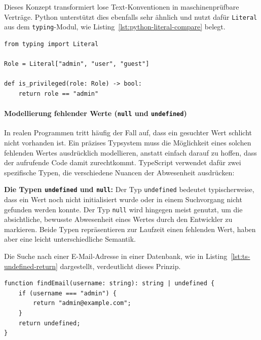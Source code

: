 Dieses Konzept transformiert lose Text-Konventionen in maschinenprüfbare Verträge. Python unterstützt dies ebenfalls sehr ähnlich und nutzt dafür \texttt{Literal} aus dem \texttt{typing}-Modul, wie Listing~\ref{lst:python-literal-compare} belegt.

\begin{listing}[htbp]
    \caption{Literal Types in Python}
    \label{lst:python-literal-compare}
    \begin{verbatim}
from typing import Literal

Role = Literal["admin", "user", "guest"]

def is_privileged(role: Role) -> bool:
    return role == "admin"
    \end{verbatim}
\end{listing}


\paragraph{Modellierung fehlender Werte (\texttt{null} und \texttt{undefined})}
\label{par:null-und-undefined}

In realen Programmen tritt häufig der Fall auf, dass ein gesuchter Wert schlicht nicht vorhanden ist. Ein präzises Typsystem muss die Möglichkeit eines solchen fehlenden Wertes ausdrücklich modellieren, anstatt einfach darauf zu hoffen, dass der aufrufende Code damit zurechtkommt. TypeScript verwendet dafür zwei spezifische Typen, die verschiedene Nuancen der Abwesenheit ausdrücken:

\begin{definition}
\label{def:ts-null-undefined}
\textbf{Die Typen \texttt{undefined} und \texttt{null}:} Der Typ \texttt{undefined} bedeutet typischerweise, dass ein Wert noch nicht initialisiert wurde oder in einem Suchvorgang nicht gefunden werden konnte. Der Typ \texttt{null} wird hingegen meist genutzt, um die absichtliche, bewusste Abwesenheit eines Wertes durch den Entwickler zu markieren. Beide Typen repräsentieren zur Laufzeit einen fehlenden Wert, haben aber eine leicht unterschiedliche Semantik.
\end{definition}

Die Suche nach einer E-Mail-Adresse in einer Datenbank, wie in Listing~\ref{lst:ts-undefined-return} dargestellt, verdeutlicht dieses Prinzip.

\begin{listing}[htbp]
    \caption{Ein möglicher fehlender Rückgabewert in TypeScript}
    \label{lst:ts-undefined-return}
    \begin{verbatim}
function findEmail(username: string): string | undefined {
    if (username === "admin") {
        return "admin@example.com";
    }
    return undefined;
}
    \end{verbatim}
\end{listing}

